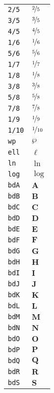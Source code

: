 \begin{longtable}{ll}
\texttt{2/5}&${}\nicefrac{2}{5} {}$\\
\texttt{3/5}&${}\nicefrac{3}{5} {}$\\
\texttt{4/5}&${}\nicefrac{4}{5} {}$\\
\texttt{1/6}&${}\nicefrac{1}{6} {}$\\
\texttt{5/6}&${}\nicefrac{5}{6} {}$\\
\texttt{1/7}&${}\nicefrac{1}{7} {}$\\
\texttt{1/8}&${}\nicefrac{1}{8} {}$\\
\texttt{3/8}&${}\nicefrac{3}{8} {}$\\
\texttt{5/8}&${}\nicefrac{5}{8} {}$\\
\texttt{7/8}&${}\nicefrac{7}{8} {}$\\
\texttt{1/9}&${}\nicefrac{1}{9} {}$\\
\texttt{1/10}&${}\nicefrac{1}{10} {}$\\
\texttt{wp}&${}\wp {}$\\
\texttt{ell}&${}\ell {}$\\
\texttt{ln}&${}\ln {}$\\
\texttt{log}&${}\log {}$\\
\texttt{bdA}&${}{\textbf{A}}{}$\\
\texttt{bdB}&${}{\textbf{B}}{}$\\
\texttt{bdC}&${}{\textbf{C}}{}$\\
\texttt{bdD}&${}{\textbf{D}}{}$\\
\texttt{bdE}&${}{\textbf{E}}{}$\\
\texttt{bdF}&${}{\textbf{F}}{}$\\
\texttt{bdG}&${}{\textbf{G}}{}$\\
\texttt{bdH}&${}{\textbf{H}}{}$\\
\texttt{bdI}&${}{\textbf{I}}{}$\\
\texttt{bdJ}&${}{\textbf{J}}{}$\\
\texttt{bdK}&${}{\textbf{K}}{}$\\
\texttt{bdL}&${}{\textbf{L}}{}$\\
\texttt{bdM}&${}{\textbf{M}}{}$\\
\texttt{bdN}&${}{\textbf{N}}{}$\\
\texttt{bdO}&${}{\textbf{O}}{}$\\
\texttt{bdP}&${}{\textbf{P}}{}$\\
\texttt{bdQ}&${}{\textbf{Q}}{}$\\
\texttt{bdR}&${}{\textbf{R}}{}$\\
\texttt{bdS}&${}{\textbf{S}}{}$\\

\end{longtable}
